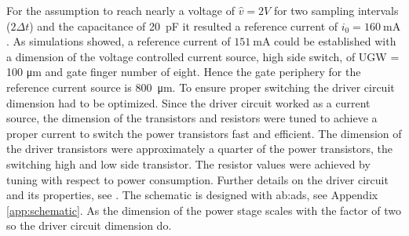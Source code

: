 For the assumption to reach nearly a voltage of $\hat{v} = 2V$ for two sampling intervals ($2 \Delta t$) and the capacitance of \SI{20}{\pico \farad} it resulted a reference current of $i_0 = \SI{160}{\milli \ampere}$.
As simulations showed, a reference current of $\SI{151}{\milli \ampere}$ could be established with a dimension of the voltage controlled current source, high side switch, of UGW = 100 \si{\micro \meter} and gate finger number of eight.
Hence the gate periphery for the reference current source is \SI{800}{\micro \meter}.
To ensure proper switching the driver circuit dimension had to be optimized.
Since the driver circuit worked as a current source, the dimension of the transistors and resistors were tuned to achieve a proper current to switch the power transistors fast and efficient.
The dimension of the driver transistors were approximately a quarter of the power transistors, the switching high and low side transistor.
The resistor values were achieved by tuning with respect to power consumption.
Further details on the driver circuit and its properties, see \cite{MaksimovicPaper}.
The schematic is designed with \gls{ab:ads}, see Appendix \ref{app:schematic}.
As the dimension of the power stage scales with the factor of two so the driver circuit dimension do.

